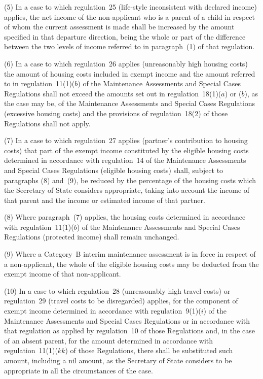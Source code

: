 \documentclass[12pt,a4paper]{article}
\begin{document}
(5) In a case to which regulation~25 (life-style inconsistent with declared income) applies, the net income of the non-applicant who is a parent of a child in respect of whom the current assessment is made shall be increased by 
the amount specified in that departure direction, being the whole or part of  %
the difference between the two levels of income referred to in paragraph~(1) of that regulation.%

(6) In a case to which regulation~26 applies (unreasonably high housing costs)
the amount of housing costs included in exempt income and the amount referred to
in regulation~11(1)($b$) of the Maintenance Assessments and Special Cases
Regulations shall not exceed the amounts set out in regulation~18(1)($a$) or ($b$),
as the case may be, of the Maintenance Assessments and Special Cases Regulations
(excessive housing costs) and the provisions of regulation~18(2) of those
Regulations shall not apply.

(7) In a case to which regulation~27 applies (partner’s contribution to housing
costs) that part of the exempt income constituted by the eligible housing costs
determined in accordance with regulation~14 of the Maintenance Assessments and
Special Cases Regulations (eligible housing costs) shall, subject to paragraphs
(8) and~(9), be reduced by the percentage of the housing costs which the
Secretary of State considers appropriate, taking into account the income of that
parent and the income or estimated income of that partner.%

(8) Where paragraph~(7) applies, the housing costs determined in accordance with
regulation~11(1)($b$) of the Maintenance Assessments and Special Cases Regulations
(protected income) shall remain unchanged.

(9) Where a Category~B interim maintenance assessment is in force in respect of
a non-applicant, the whole of the eligible housing costs may be deducted from
the exempt income of that non-applicant.

(10) In a case to which regulation~28 (unreasonably high travel costs) or
regulation~29 (travel costs to be disregarded) applies, for the component of
exempt income determined in accordance with regulation~9(1)($i$) of the
Maintenance Assessments and Special Cases Regulations or in accordance with that
regulation as applied by regulation~10 of those Regulations and, in the case of
an absent parent, for the amount determined in accordance with regulation~11(1)($kk$) of those Regulations, there shall be substituted such amount,
including a nil amount, as the Secretary of State considers to be appropriate in
all the circumstances of the case.
\end{document}
